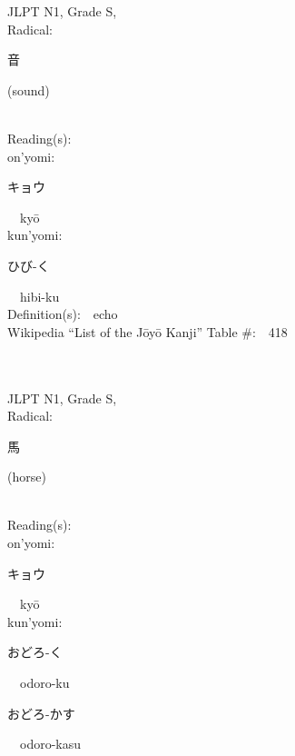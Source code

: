 \begin{multicols}{2}
{JLPT N1, Grade S, \\Radical:\ \ {\begin{CJK}{UTF8}{min} 音 \end{CJK}} (sound) } \\
Reading(s):\ \ \\
{\hspace*{1em}}on'yomi:\ \ \\
{\hspace*{2em}}{\begin{CJK}{UTF8}{min} キョウ \end{CJK}}\ \ ky\=o\ \ \\
{\hspace*{1em}}kun'yomi:\ \ \\
{\hspace*{2em}}{\begin{CJK}{UTF8}{min} ひび-く \end{CJK}}\ \ hibi-ku\ \ \\
Definition(s):\ \ echo \\
Wikipedia ``List of the J\=oy\=o Kanji'' Table \#:\ \ 418 \\
\ \ \\
{\fontsize{34pt}{40pt}  }\ \ \\
{JLPT N1, Grade S, \\Radical:\ \ {\begin{CJK}{UTF8}{min} 馬 \end{CJK}} (horse) } \\
Reading(s):\ \ \\
{\hspace*{1em}}on'yomi:\ \ \\
{\hspace*{2em}}{\begin{CJK}{UTF8}{min} キョウ \end{CJK}}\ \ ky\=o\ \ \\
{\hspace*{1em}}kun'yomi:\ \ \\
{\hspace*{2em}}{\begin{CJK}{UTF8}{min} おどろ-く \end{CJK}}\ \ odoro-ku\ \ \\
{\hspace*{2em}}{\begin{CJK}{UTF8}{min} おどろ-かす \end{CJK}}\ \ odoro-kasu\ \ \\

\end{multicols}
